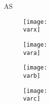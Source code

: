 






\newcommand{\var}{AS}
\newcommand{\varx}{figures/AS_text.png}
\newcommand{\vara}{figures/AS_femur.png}
\newcommand{\varb}{figures/AS_tibia.png}
\newcommand{\varc}{figures/AS_patella.png}

\begin{frame}{\var}

\begin{minipage}[t]{0.3\linewidth}
\begin{figure}[!htbp]
    \centering
    \texttt{[image: \\varx]}
\end{figure}

\vspace{30pt}
\begin{figure}[!htbp]
    \centering
    \texttt{[image: \\vara]}
\end{figure}
\end{minipage}
%
\begin{minipage}[t]{0.3\linewidth}
\begin{figure}[!htbp]
    \centering
    \texttt{[image: \\varb]}
\end{figure}
\end{minipage}
%
\begin{minipage}[t]{0.3\linewidth}
\vspace{90pt}
\begin{figure}[!htbp]
    \centering
    \texttt{[image: \\varc]}
\end{figure}
\end{minipage}

\end{frame}







